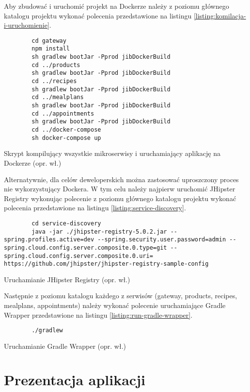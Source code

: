 Aby zbudować i uruchomić projekt na Dockerze należy z poziomu głównego katalogu projektu wykonać polecenia przedstawione na listingu \ref{listing:komilacja-i-uruchomienie}.
\begin{listing}[h!]
    \begin{verbatim}
        cd gateway
        npm install
        sh gradlew bootJar -Pprod jibDockerBuild
        cd ../products
        sh gradlew bootJar -Pprod jibDockerBuild
        cd ../recipes
        sh gradlew bootJar -Pprod jibDockerBuild
        cd ../mealplans
        sh gradlew bootJar -Pprod jibDockerBuild
        cd ../appointments
        sh gradlew bootJar -Pprod jibDockerBuild
        cd ../docker-compose
        sh docker-compose up
    \end{verbatim}
    \caption{Skrypt kompilujący wszystkie mikroserwisy i uruchamiający aplikację na Dockerze (opr. wł.)} \label{listing:komilacja-i-uruchomienie}
\end{listing}

Alternatywnie, dla celów deweloperskich można zastosować uproszczony proces nie wykorzystujący Dockera.
W tym celu należy najpierw uruchomić JHipster Registry wykonując polecenie z poziomu głównego katalogu projektu wykonać polecenia przedstawione na listingu \ref{listing:service-discovery}.
\begin{listing}[h!]
    \begin{verbatim}
        cd service-discovery
        java -jar ./jhipster-registry-5.0.2.jar --spring.profiles.active=dev --spring.security.user.password=admin --spring.cloud.config.server.composite.0.type=git --spring.cloud.config.server.composite.0.uri= https://github.com/jhipster/jhipster-registry-sample-config
    \end{verbatim}
    \caption{Uruchamianie JHipster Registry (opr. wł.)} \label{listing:service-discovery}
\end{listing}

Następnie z poziomu katalogu każdego z serwisów (gateway, products, recipes, mealplans, appointments) należy wykonać polecenie uruchamiające Gradle Wrapper przedstawione na listingu \ref{listing:run-gradle-wrapper}.
\begin{listing}[h!]
    \begin{verbatim}
        ./gradlew
    \end{verbatim}
    \caption{Uruchamianie Gradle Wrapper (opr. wł.)} \label{listing:run-gradle-wrapper}
\end{listing}

\section{Prezentacja aplikacji}\label{sec:app-presentation}

